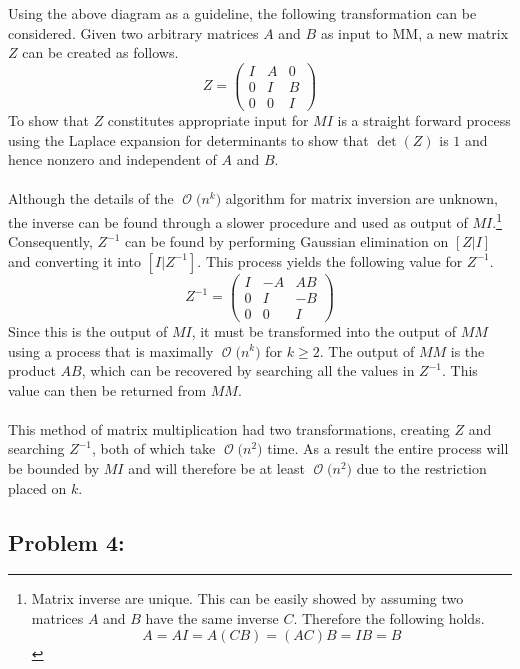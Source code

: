 \documentclass[12pt]{article}
\newcommand{\BigO}[1]{\ensuremath{\operatorname{\mathcal{O}}\bigl(#1\bigr)}}
\begin{document}
Using the above diagram as a guideline, the following transformation
can be considered.  Given two arbitrary matrices $A$ and $B$ as input
to MM, a new matrix $Z$ can be created as follows.
\[
Z =
    \begin{pmatrix}
    I & A & 0 \\
    0 & I & B \\
    0 & 0 & I 
    \end{pmatrix}
\]
To show that $Z$ constitutes appropriate input for $MI$ is a straight
forward process using the Laplace expansion for determinants to show
that $\det(Z)$ is $1$ and hence nonzero and independent of $A$ and $B$.\\\\
Although the details of the \BigO{n^k} algorithm for matrix inversion
are unknown, the inverse can be found through a slower procedure and 
used as output of $MI$.\footnote{Matrix inverse are unique.  This can
be easily showed by assuming two matrices $A$ and $B$ have the same inverse
$C$.  Therefore the following holds.
\[
A = AI = A(CB) = (AC)B = IB = B
\]
}
Consequently, $Z^{-1}$ can be found by performing Gaussian elimination
on $[Z|I]$ and converting it into $[I|Z^{-1}]$.  This process yields the
following value for $Z^{-1}$.
\[
Z^{-1} =
    \begin{pmatrix}
    I & -A & AB \\
    0 & I & -B \\
    0 & 0 & I 
    \end{pmatrix}
\]
Since this is the output of $MI$, it must be transformed into the output
of $MM$ using a process that is maximally \BigO{n^k} for $k\geq2$.  The
output of $MM$ is the product $AB$, which can be recovered by searching 
all the values in $Z^{-1}$.  This value can then be returned from $MM$.\\\\
This method of matrix multiplication had two transformations, creating
$Z$ and searching $Z^{-1}$, both of which take \BigO{n^2} time.  As a result
the entire process will be bounded by $MI$ and will therefore be at least
\BigO{n^2} due to the restriction placed on $k$.
\subsection*{Problem 4:}
\end{document}
